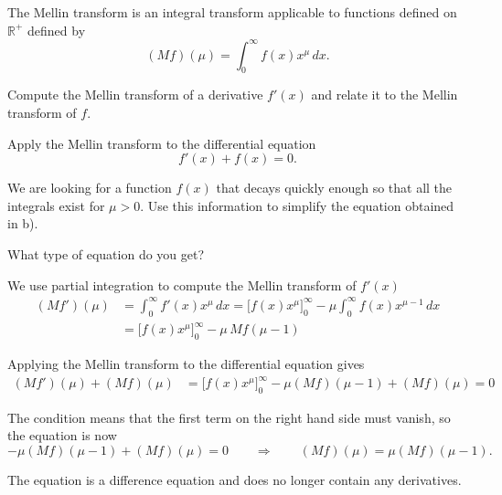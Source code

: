 The Mellin transform is an integral transform applicable to functions
defined on $\mathbb R^+$ defined by
\[
(Mf)(\mu)
=
\int_0^\infty f(x) x^\mu\,dx.
\]
\begin{teilaufgaben}
\item
Compute the Mellin transform of a derivative $f'(x)$ and relate it to the
Mellin transform of $f$.
\item
Apply the Mellin transform to the differential equation
\[
f'(x)+f(x)=0.
\]
\item
We are looking for a function $f(x)$ that decays quickly enough so that
all the integrals exist for $\mu>0$.
Use this information to simplify the equation obtained in b).
\item
What type of equation do you get?
\end{teilaufgaben}

\begin{loesung}
\begin{teilaufgaben}
\item
We use partial integration to compute the Mellin transform of $f'(x)$
\begin{align*}
(Mf')(\mu)
&=
\int_0^\infty f'(x)x^\mu\,dx
=
\biggl[ f(x)x^\mu \biggr]_0^\infty
-
\mu
\int_0^\infty f(x)x^{\mu-1}\,dx
\\
&=
\biggl[ f(x)x^\mu \biggr]_0^\infty
-
\mu \,Mf(\mu-1)
\end{align*}
\item
Applying the Mellin transform to the differential equation gives
\begin{align*}
(Mf')(\mu) + (Mf)(\mu)
&=
\bigl[f(x)x^\mu\bigr]_0^\infty - \mu (Mf)(\mu-1) + (Mf)(\mu) = 0
\end{align*}
\item
The condition means that the first term on the right hand side must
vanish, so the equation is now
\[
- \mu (Mf)(\mu-1) + (Mf)(\mu) = 0
\qquad\Rightarrow\qquad
(Mf)(\mu) = \mu (Mf)(\mu-1).
\]
\item
The equation is a difference equation and does no longer contain
any derivatives.
\qedhere
\end{teilaufgaben}
\end{loesung}







